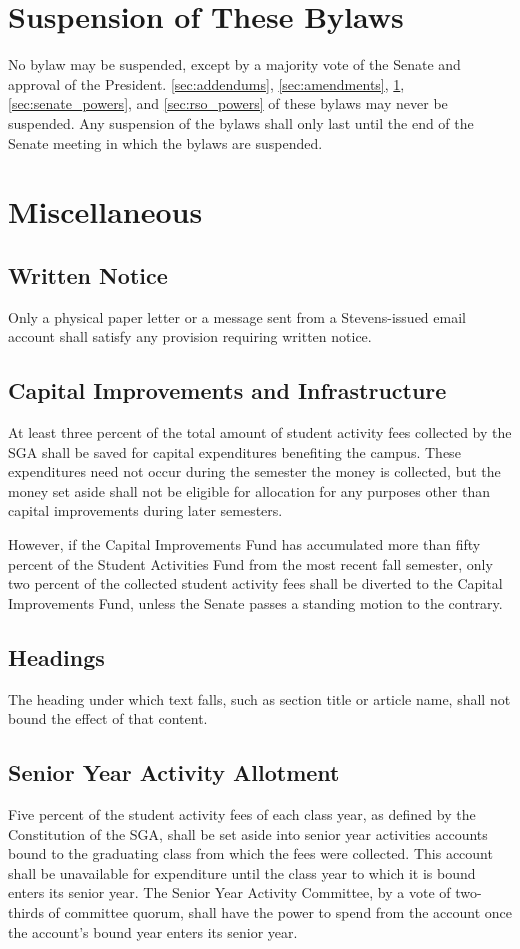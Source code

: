 \documentclass[12pt]{scrreprt}
\begin{document}
\chapter{Suspension of These Bylaws} \label{sec:suspension}
No bylaw may be suspended, except by a majority vote of the Senate and 
approval of the President. \ref{sec:addendums}, \ref{sec:amendments}, \ref{sec:suspension}, 
\ref{sec:senate_powers}, and \ref{sec:rso_powers} of these bylaws may never be 
suspended. Any suspension of the bylaws shall only last until the end of the 
Senate meeting in which the bylaws are suspended. 

\chapter{Miscellaneous}

\section{Written Notice}
Only a physical paper letter or a message sent from a Stevens-issued email account shall satisfy any provision
requiring written notice.

\section{Capital Improvements and Infrastructure}
At least three percent of the total amount of student activity fees collected 
by the SGA shall be saved for capital expenditures benefiting the campus. 
These expenditures need not occur during the semester the money is collected, 
but the money set aside shall not be eligible for allocation for any purposes 
other than capital improvements during later semesters. 

However, if the Capital Improvements Fund has accumulated more than fifty 
percent of the Student Activities Fund from the most recent fall semester, 
only two percent of the collected student activity fees shall be diverted to 
the Capital Improvements Fund, unless the Senate passes a standing motion to 
the contrary. 

\section{Headings}
The heading under which text falls, such as section title or article name, 
shall not bound the effect of that content. 

\section{Senior Year Activity Allotment}
Five percent of the student activity fees of each class year, as defined by 
the Constitution of the SGA, shall be set aside into senior year activities 
accounts bound to the graduating class from which the fees were collected. 
This account shall be unavailable for expenditure until the class year to 
which it is bound enters its senior year. The Senior Year Activity Committee, 
by a vote of two-thirds of committee quorum, shall have the power to spend 
from the account once the account's bound year enters its senior year. 
\end{document}
